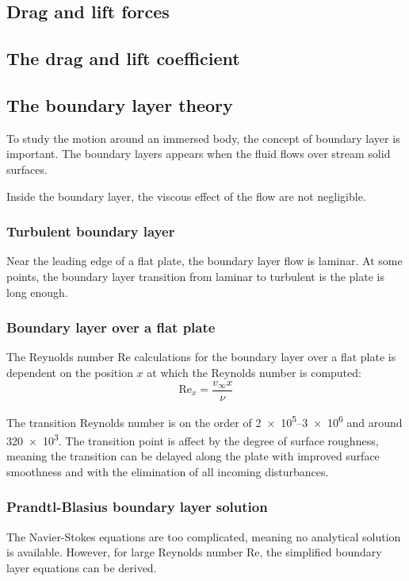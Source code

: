 \documentclass[10pt, twocolumn]{article}
\begin{document}
\subsection{Drag and lift forces}






\subsection{The drag and lift coefficient}






\subsection{The boundary layer theory}
To study the motion around an immersed body, the concept of boundary layer is important.
The boundary layers appears when the fluid flows over stream solid surfaces.

Inside the boundary layer, the viscous effect of the flow are not negligible.


\subsubsection{Turbulent boundary layer}
Near the leading edge of a flat plate, the boundary layer flow is laminar.
At some points, the boundary layer transition from laminar to turbulent is the plate is long enough.

\subsubsection{Boundary layer over a flat plate}
The Reynolds number Re calculations for the boundary layer over a flat plate is dependent on the position \(x\) at which the Reynolds number is computed:
\[
  \mathrm{Re}_x = \frac{v_\infty x}{\nu}
\]

The transition Reynolds number is on the order of \numrange{2e5}{3e6} and around \num{320e3}.
The transition point is affect by the degree of surface roughness, meaning the transition can be delayed along the plate with improved surface smoothness and with the elimination of all incoming disturbances.


\subsubsection{Prandtl-Blasius boundary layer solution}
The Navier-Stokes equations are too complicated, meaning no analytical solution is available.
However, for large Reynolds number Re, the simplified boundary layer equations can be derived.
\end{document}
